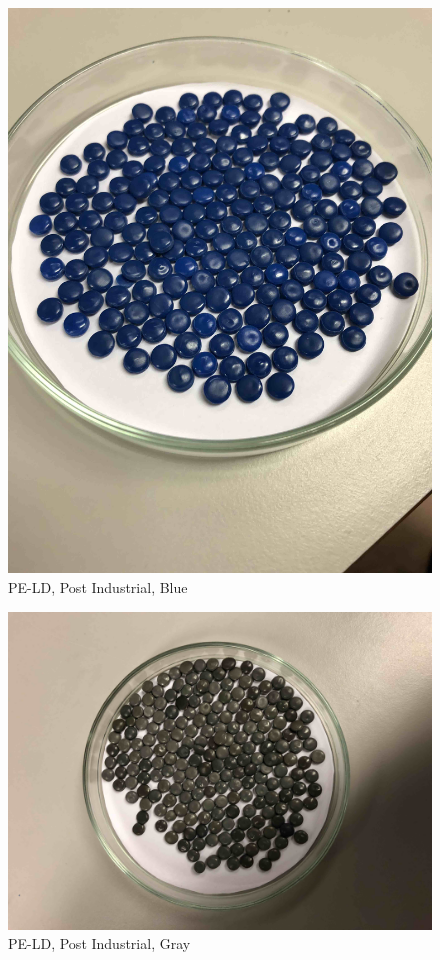 \begin{appendices}
\begin{figure}
    \centering
    \includegraphics[width = 12cm]{Images/appendix/PE-Recyclate-(Post-Industrial)-blue.jpg}
    \caption[$\; \:$PE-LD Post Industrial, Blue]{PE-LD, Post Industrial, Blue}
    \label{fig:peld-blue}
\end{figure}

\begin{figure}
    \centering
    \includegraphics[width = 12cm]{Images/appendix/PE-Recyclate-(Post-Industrial)-gray.jpg}
    \caption[$\; \:$PE-LD Post Industrial, Gray]{PE-LD, Post Industrial, Gray}
    \label{fig:peld-gray}
\end{figure}


\end{appendices}
